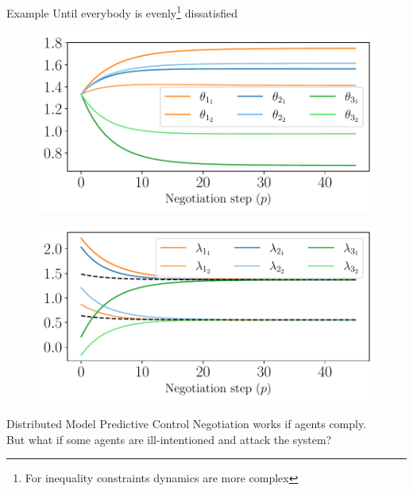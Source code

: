 \documentclass[handout,aspectratio=169]{beamer}
\begin{document}
\begin{frame}{Example}
  \centering
  Until everybody is evenly\footnote{For inequality constraints dynamics are more complex} dissatisfied
  \vspace{1cm}

  \begin{minipage}{0.45\textwidth}
    \begin{figure}
      \includegraphics[width=\textwidth]{../img/example_primal_decomposition/example_theta.pdf}
    \end{figure}
  \end{minipage}
  \hfill
  \begin{minipage}{0.45\textwidth}
    \begin{figure}
      \centering
      \includegraphics[width=\textwidth]{../img/example_primal_decomposition/example_lambda.pdf}
    \end{figure}
  \end{minipage}
\end{frame}

\begin{frame}{Distributed Model Predictive Control}
  Negotiation works if agents comply.\\\pause
  But what if some agents are ill-intentioned and attack the system?

\end{frame}
\end{document}
